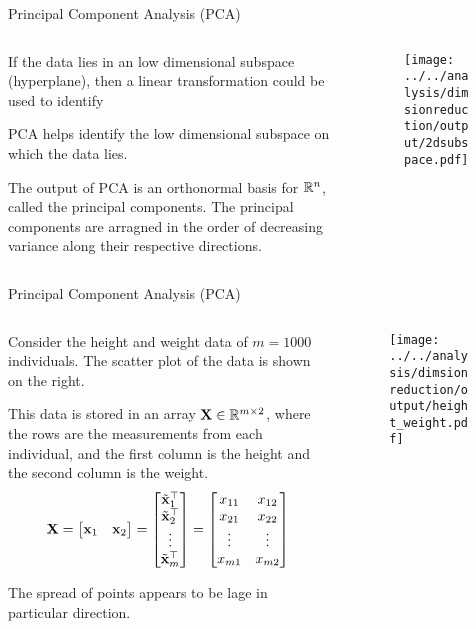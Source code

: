 \documentclass[aspectratio=169]{beamer}
\def\mf{\ensuremath\mathbf}
\def\mb{\ensuremath\mathbb}
\def\emx{\ensuremath\end{bmatrix*}}
\def\bmxc{\ensuremath\begin{bmatrix*}[c]}
\begin{document}
\begin{frame}[t]{Principal Component Analysis (PCA)}
  \begin{columns}
    \begin{column}{0.4\textwidth}
      If the data lies in an low dimensional subspace (hyperplane), then a linear transformation could be used to identify 
      \vspace{0.2cm}

      PCA helps identify the low dimensional subspace on which the data lies.
      \vspace{0.2cm}

      The output of PCA is an orthonormal basis for $\mb{R}^n$, called the principal components. The principal components are arragned in the order of decreasing variance along their respective directions.
    \end{column}
    \begin{column}{0.575\textwidth}
      \begin{figure}
        \centering
        \texttt{[image: ../../analysis/dimsionreduction/output/2dsubspace.pdf]}
      \end{figure}
    \end{column}
  \end{columns}
\end{frame}


\begin{frame}[t]{Principal Component Analysis (PCA)}
  \begin{columns}
    \begin{column}{0.55\textwidth}
      {\small
      Consider the height and weight data of $m=1000$ individuals. The scatter plot of the data is shown on the right.
      \vspace{0.2cm}

      This data is stored in an array $\mf{X} \in \mb{R}^{m \times 2}$, where the rows are the measurements from each individual, and the first column is the height and the second column is the weight.
      \[ \mf{X} = \bmxc \mf{x}_{1} & \mf{x}_{2} \emx = \bmxc \tilde{\mf{x}}_{1}^\top \\ \tilde{\mf{x}}_{2}^\top \\ \vdots \\ \tilde{\mf{x}}_{m}^\top \emx = \bmxc x_{11} & x_{12} \\ x_{21} & x_{22} \\ \vdots & \vdots \\ x_{m1} & x_{m2}\emx\]

      The spread of points appears to be lage in particular direction.
      }
    \end{column}
    \begin{column}{0.425\textwidth}
      \begin{figure}
        \centering
        \texttt{[image: ../../analysis/dimsionreduction/output/height\_weight.pdf]}
      \end{figure}
    \end{column}
  \end{columns}
\end{frame}
\end{document}
